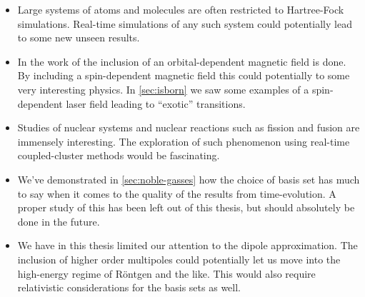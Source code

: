             \begin{itemize}
                \item Large systems of atoms and molecules are often restricted
                    to Hartree-Fock simulations.
                    Real-time simulations of any such system could potentially
                    lead to some new unseen results.
                \item In the work of \citeauthor{greg-winther}
                    \cite{greg-winther} the inclusion of an orbital-dependent
                    magnetic field is done.
                    By including a spin-dependent magnetic field this could
                    potentially to some very interesting physics.
                    In \autoref{sec:isborn} we saw some examples of a
                    spin-dependent laser field leading to ``exotic''
                    transitions.
                \item Studies of nuclear systems and nuclear reactions such as
                    fission and fusion are immensely interesting.
                    The exploration of such phenomenon using real-time
                    coupled-cluster methods would be fascinating.
                \item We've demonstrated in \autoref{sec:noble-gasses} how the
                    choice of basis set has much to say when it comes to the
                    quality of the results from time-evolution.
                    A proper study of this has been left out of this thesis, but
                    should absolutely be done in the future.
                \item We have in this thesis limited our attention to the dipole
                    approximation.
                    The inclusion of higher order multipoles could potentially
                    let us move into the high-energy regime of Röntgen and the
                    like.
                    This would also require relativistic considerations for the
                    basis sets as well.
            \end{itemize}
